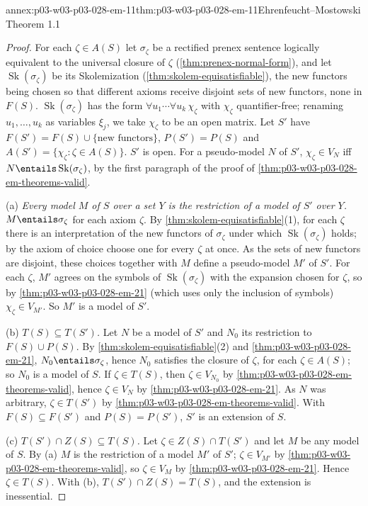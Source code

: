 \begin{annexitem}{annex:p03-w03-p03-028-em-11}{thm:p03-w03-p03-028-em-11}{Ehrenfeucht--Mostowski Theorem 1.1}
\begin{proof}
For each \(\zeta\in A(S)\) let \(\sigma_\zeta\) be a rectified prenex sentence
logically equivalent to the universal closure of \(\zeta\)
(\cref{thm:prenex-normal-form}), and let \(\operatorname{Sk}(\sigma_\zeta)\) be
its Skolemization (\cref{thm:skolem-equisatisfiable}), the new functors being
chosen so that different axioms receive disjoint sets of new functors, none
in \(F(S)\).  \(\operatorname{Sk}(\sigma_\zeta)\) has the form
\(\forall u_1\cdots\forall u_k\,\chi_\zeta\) with \(\chi_\zeta\)
quantifier-free; renaming \(u_1,\ldots,u_k\) as variables \(\xi_j\), we take
\(\chi_\zeta\) to be an open matrix.  Let \(S'\) have
\(F(S')=F(S)\cup\{\text{new functors}\}\), \(P(S')=P(S)\) and
\(A(S')=\{\chi_\zeta:\zeta\in A(S)\}\).  \(S'\) is open.  For a pseudo-model
\(N\) of \(S'\), \(\chi_\zeta\in V_N\) iff \(N\entails\operatorname{Sk}(\sigma_\zeta)\),
by the first paragraph of the proof of
\cref{thm:p03-w03-p03-028-em-theorems-valid}.

(a) \emph{Every model \(M\) of \(S\) over a set \(Y\) is the restriction of a
model of \(S'\) over \(Y\).}  \(M\entails\sigma_\zeta\) for each axiom
\(\zeta\).  By \cref{thm:skolem-equisatisfiable}(1), for each \(\zeta\)
there is an interpretation of the new functors of \(\sigma_\zeta\) under which
\(\operatorname{Sk}(\sigma_\zeta)\) holds; by the axiom of choice choose one
for every \(\zeta\) at once.  As the sets of new functors are disjoint, these
choices together with \(M\) define a pseudo-model \(M'\) of \(S'\).  For each
\(\zeta\), \(M'\) agrees on the symbols of
\(\operatorname{Sk}(\sigma_\zeta)\) with the expansion chosen for \(\zeta\),
so by \cref{thm:p03-w03-p03-028-em-21} (which uses only the inclusion of
symbols) \(\chi_\zeta\in V_{M'}\).  So \(M'\) is a model of \(S'\).

(b) \emph{\(T(S)\subseteq T(S')\).}  Let \(N\) be a model of \(S'\) and \(N_0\)
its restriction to \(F(S)\cup P(S)\).  By
\cref{thm:skolem-equisatisfiable}(2) and
\cref{thm:p03-w03-p03-028-em-21}, \(N_0\entails\sigma_\zeta\), hence \(N_0\)
satisfies the closure of \(\zeta\), for each \(\zeta\in A(S)\); so \(N_0\) is a
model of \(S\).  If \(\zeta\in T(S)\), then \(\zeta\in V_{N_0}\) by
\cref{thm:p03-w03-p03-028-em-theorems-valid}, hence \(\zeta\in V_N\) by
\cref{thm:p03-w03-p03-028-em-21}.  As \(N\) was arbitrary, \(\zeta\in T(S')\)
by \cref{thm:p03-w03-p03-028-em-theorems-valid}.  With \(F(S)\subseteq F(S')\)
and \(P(S)=P(S')\), \(S'\) is an extension of \(S\).

(c) \emph{\(T(S')\cap Z(S)\subseteq T(S)\).}  Let \(\zeta\in Z(S)\cap T(S')\)
and let \(M\) be any model of \(S\).  By (a) \(M\) is the restriction of a
model \(M'\) of \(S'\); \(\zeta\in V_{M'}\) by
\cref{thm:p03-w03-p03-028-em-theorems-valid}, so \(\zeta\in V_M\) by
\cref{thm:p03-w03-p03-028-em-21}.  Hence \(\zeta\in T(S)\).  With (b),
\(T(S')\cap Z(S)=T(S)\), and the extension is inessential.
\end{proof}
\end{annexitem}

